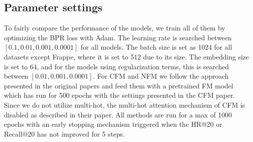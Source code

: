 \subsection{Parameter settings}
To fairly compare the performance of the models, we train all of them by optimizing the BPR loss with Adam.
The learning rate is searched between $[0.1, 0.01, 0.001, 0.0001]$ for all models.
The batch size is set as 1024 for all datasets except Frappe, where it is set to 512 due to its size.
The embedding size is set to 64, and for the models using regularization terms, this is searched between $[0.01, 0.001, 0.0001]$.
For CFM and NFM we follow the approach presented in the original papers and feed them with a pretrained FM model which has run for 500 epochs with the settings presented in the CFM paper.
Since we do not utilize multi-hot, the multi-hot attention mechanism of CFM is disabled as described in their paper.
All methods are run for a max of 1000 epochs with an early stopping mechanism triggered when the HR@20 or Recall@20 has not improved for 5 steps.


